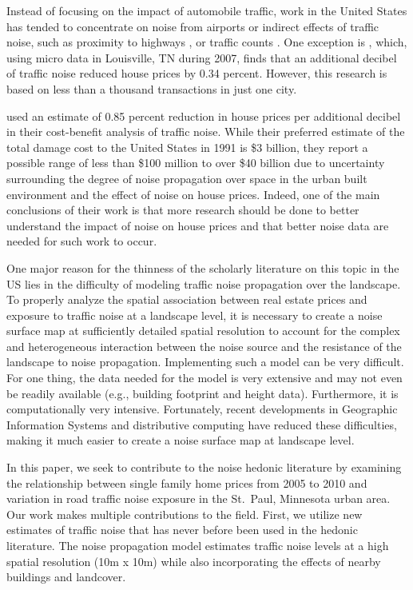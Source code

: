 \documentclass{article}\usepackage{graphicx, color}
\begin{document}
Instead of focusing on the impact of automobile traffic, work in the United States has tended to concentrate on noise from airports \citep{Espey2000, McMillen2004, Cohen2008a} or indirect effects of traffic noise, such as proximity to highways \citep{Matthews2007, Chernobai2009, Li2012}, or traffic counts \citep{HughesJr.1992, Larsen2012}. One exception is \citet{Cheng2008}, which, using micro data in Louisville, TN during 2007, finds that an additional decibel of traffic noise reduced house prices by 0.34 percent. However, this research is based on less than a thousand transactions in just one city.

\citet{Delucchi1998} used an estimate of 0.85 percent reduction in house prices per additional decibel in their cost-benefit analysis of traffic noise. While their preferred estimate of the total damage cost to the United States in 1991 is \$3 billion, they report a possible range of less than \$100 million to over \$40 billion due to uncertainty surrounding the degree of noise propagation over space in the urban built environment and the effect of noise on house prices. Indeed, one of the main conclusions of their work is that more research should be done to better understand the impact of noise on house prices and that better noise data are needed for such work to occur. 

One major reason for the thinness of the scholarly literature on this topic in the US lies in the difficulty of modeling traffic noise propagation over the landscape. To properly analyze the spatial association between real estate prices and exposure to traffic noise at a landscape level, it is necessary to create a noise surface map at sufficiently detailed spatial resolution to account for the complex and heterogeneous interaction between the noise source and the resistance of the landscape to noise propagation.  Implementing such a model can be very difficult.  For one thing, the data needed for the model is very extensive and may not even be readily available (e.g., building footprint and height data).  Furthermore, it is computationally very intensive. Fortunately, recent developments in Geographic Information Systems and distributive computing have reduced these difficulties, making it much easier to create a noise surface map at landscape level.  

In this paper, we seek to contribute to the noise hedonic literature by examining the relationship between single family home prices from 2005 to 2010 and variation in road traffic noise exposure in the St.\ Paul, Minnesota urban area. Our work makes multiple contributions to the field. First, we utilize new estimates of traffic noise that has never before been used in the hedonic literature. The noise propagation model estimates traffic noise levels at a high spatial resolution (10m x 10m) while also incorporating the effects of nearby buildings and landcover. 
\end{document}
